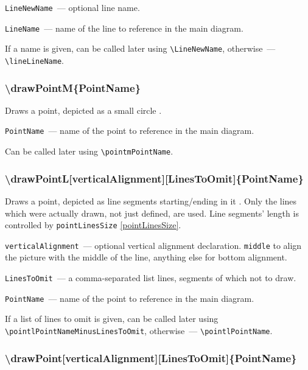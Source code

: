 	\texttt{LineNewName}~— optional line name. 
	
	\texttt{LineName}~— name of the line to reference in the main diagram. 
	
	If a name is given, can be called later using \texttt{\textbackslash LineNewName}, otherwise~— \texttt{\textbackslash lineLineName}. 
	
\subsubsection{\textbackslash drawPointM\{PointName\}}


	Draws a point, depicted as a small circle .
	
	\texttt{PointName}~— name of the point to reference in the main diagram. 
	
	Can be called later using \texttt{\textbackslash pointmPointName}. 

\subsubsection{\textbackslash drawPointL[verticalAlignment][LinesToOmit]\{PointName\}}\label{drawPointL}

	Draws a point, depicted as line segments starting/ending in it . Only the lines which were actually drawn, not just defined, are used. Line segments' length is controlled by \texttt{pointLinesSize} \ref{pointLinesSize}.

	\texttt{verticalAlignment}~— optional vertical alignment declaration. \texttt{middle} to align the picture with the middle of the line, anything else for bottom alignment.
	
	\texttt{LinesToOmit}~— a comma-separated list lines, segments of which not to draw. 
	
	\texttt{PointName}~— name of the point to reference in the main diagram. 
	
	If a list of lines to omit is given, can be called later using \texttt{\textbackslash pointl\-Point\-Name\-Minus\-Lines\-To\-Omit}, otherwise~— \texttt{\textbackslash pointlPointName}. 

\subsubsection{\textbackslash drawPoint[verticalAlignment][LinesToOmit]\{PointName\}}

